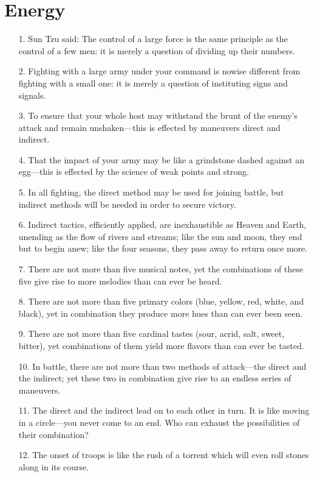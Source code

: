 \documentclass[11pt,openany]{memoir}
\newcommand{\enumeratemargin}{1.30em}
\begin{document}
\chapter{Energy}
\begin{enumerate}[leftmargin=\enumeratemargin]
\item[1.] Sun Tzu said: The control of a large force is the same principle as the control of a few men: it is merely a question of dividing up their numbers.
\item[2.] Fighting with a large army under your command is nowise different from fighting with a small one: it is merely a question of instituting signs and signals.
\item[3.] To ensure that your whole host may withstand the brunt of the enemy's attack and remain unshaken---this is effected by maneuvers direct and indirect.
\item[4.] That the impact of your army may be like a grindstone dashed against an egg---this is effected by the science of weak points and strong.
\item[5.] In all fighting, the direct method may be used for joining battle, but indirect methods will be needed in order to secure victory.
\item[6.] Indirect tactics, efficiently applied, are inexhaustible as Heaven and Earth, unending as the flow of rivers and streams; like the sun and moon, they end but to begin anew; like the four seasons, they pass away to return once more.
\item[7.] There are not more than five musical notes, yet the combinations of these five give rise to more melodies than can ever be heard.
\item[8.] There are not more than five primary colors (blue, yellow, red, white, and black), yet in combination they produce more hues than can ever been seen.
\item[9.] There are not more than five cardinal tastes (sour, acrid, salt, sweet, bitter), yet combinations of them yield more flavors than can ever be tasted.
\item[10.] In battle, there are not more than two methods of attack---the direct and the indirect; yet these two in combination give rise to an endless series of maneuvers.
\item[11.] The direct and the indirect lead on to each other in turn. It is like moving in a circle---you never come to an end. Who can exhaust the possibilities of their combination?
\item[12.] The onset of troops is like the rush of a torrent which will even roll stones along in its course.

\end{enumerate}
\end{document}
